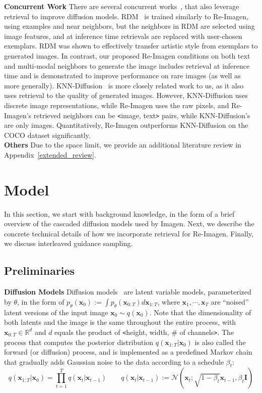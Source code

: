 \documentclass{article} \usepackage{iclr2023_conference,times}
\newcommand{\modelname}{{Re-Imagen}\xspace}
\begin{document}
\noindent \textbf{Concurrent Work} There are several concurrent works~\citep{li2022memory,blattmann2022retrieval,ashual2022knn}, that also leverage retrieval to improve diffusion models.  RDM~\citep{blattmann2022retrieval} is trained similarly to \modelname, using examples and near neighbors, but the neighbors in RDM are selected using image features, and at inference time retrievals are replaced with user-chosen exemplars. RDM was shown to effectively transfer artistic style from exemplars to generated images.  In contrast, our proposed \modelname conditions on both text and multi-modal neighbors to generate the image includes retrieval at inference time and is demonstrated to improve performance on rare images (as well as more generally).  KNN-Diffusion~\citep{ashual2022knn} is more closely related work to us, as it also uses retrieval to the quality of generated images. However, KNN-Diffusion uses discrete image representations, while \modelname uses the raw pixels, and \modelname's retrieved neighbors can be \texttt{<}image, text\texttt{>} pairs, while KNN-Diffusion's are only images. Quantitatively, \modelname{} outperforms  KNN-Diffusion on the COCO dataset significantly. \vspace{1ex}\\
\noindent \textbf{Others} Due to the space limit, we provide an additional literature review in Appendix~\ref{extended_review}.


\section{Model}

In this section, we start with background knowledge, in the form of a brief overview of the cascaded diffusion models used by Imagen. Next, we describe the concrete technical details of how we incorporate retrieval for \modelname. Finally, we discuss interleaved guidance sampling.

\subsection{Preliminaries}
\noindent \textbf{Diffusion Models}
Diffusion models~\citep{sohl2015deep} are latent variable models, parameterized by $\theta$, in the form of $p_{\theta}(\bm{x}_0) := \int p_{\theta}(\bm{x}_{0:T})d\bm{x}_{1:T}$, where $\bm{x}_1, \cdots, \bm{x}_T$ are ``noised'' latent versions of the input image $\bm{x}_0 \sim q(\bm{x}_0)$. Note that the dimensionality of both latents and the image is the same throughout the entire process, with $\bm{x}_{0:T} \in \mathbb{R}^d$ and $d$ equals the product of \texttt{<}height, width, \# of channels\texttt{>}. The process that computes the posterior distribution $q(\bm{x}_{1:T}|\bm{x}_0)$ is also called the forward (or diffusion) process, and is implemented as a predefined Markov chain that gradually adds Gaussian noise to the data according to a schedule $\beta_t$:
\begin{equation}
    q(\bm{x}_{1:T}|\bm{x}_0)=\prod_{t=1}^{T}q(\bm{x}_t | \bm{x}_{t-1}) \quad \quad q(\bm{x}_t | \bm{x}_{t-1}) := \mathcal{N}(\bm{x}_t; \sqrt{1 - \beta_t}\bm{x}_{t-1}, \beta_t \bm{I})
\end{equation}
\end{document}
